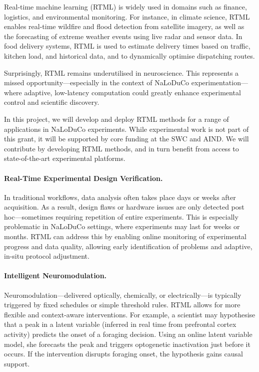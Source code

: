 \label{sec:rtmlNeuro}

Real-time machine learning (RTML) is widely used in domains such as finance, logistics, and environmental monitoring. For instance, in climate science, RTML enables real-time wildfire and flood detection from satellite imagery, as well as the forecasting of extreme weather events using live radar and sensor data. In food delivery systems, RTML is used to estimate delivery times based on traffic, kitchen load, and historical data, and to dynamically optimise dispatching routes.

Surprisingly, RTML remains underutilised in neuroscience. This represents a missed opportunity—especially in the context of NaLoDuCo experimentation—where adaptive, low-latency computation could greatly enhance experimental control and scientific discovery.

In this project, we will develop and deploy RTML methods for a range of applications in NaLoDuCo experiments. While experimental work is not part of this grant, it will be supported by core funding at the SWC and AIND. We will contribute by developing RTML methods, and in turn benefit from access to state-of-the-art experimental platforms.

\paragraph{Real-Time Experimental Design Verification.}
In traditional workflows, data analysis often takes place days or weeks after acquisition. As a result, design flaws or hardware issues are only detected post hoc—sometimes requiring repetition of entire experiments. This is especially problematic in NaLoDuCo settings, where experiments may last for weeks or months. RTML can address this by enabling online monitoring of experimental progress and data quality, allowing early identification of problems and adaptive, in-situ protocol adjustment.

\paragraph{Intelligent Neuromodulation.}
Neuromodulation—delivered optically, chemically, or electrically—is typically triggered by fixed schedules or simple threshold rules. RTML allows for more flexible and context-aware interventions. For example, a scientist may hypothesise that a peak in a latent variable (inferred in real time from prefrontal cortex activity) predicts the onset of a foraging decision. Using an online latent variable model, she forecasts the peak and triggers optogenetic inactivation just before it occurs. If the intervention disrupts foraging onset, the hypothesis gains causal support.

